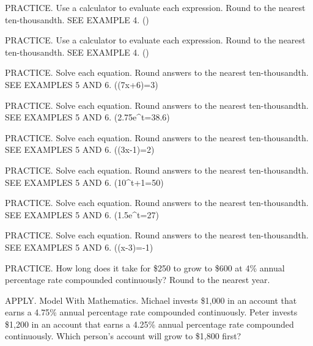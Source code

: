 \documentclass{article}
\newenvironment{practice}[2]{}{}        %
\newcommand{\answer}[1]{}               %
\begin{document}
\begin{practice}{44}{1}
PRACTICE. Use a calculator to evaluate each expression. Round to the nearest ten-thousandth. SEE EXAMPLE 4.
()
\answer{1.0792}
\end{practice}
\begin{practice}{45}{2}
PRACTICE. Use a calculator to evaluate each expression. Round to the nearest ten-thousandth. SEE EXAMPLE 4.
()
\answer{1.0986}
\end{practice}
\begin{practice}{46}{2}
PRACTICE. Solve each equation. Round answers to the nearest ten-thousandth. SEE EXAMPLES 5 AND 6.
(\log(7x+6)=3)
\answer{142}
\end{practice}
\begin{practice}{47}{2}
PRACTICE. Solve each equation. Round answers to the nearest ten-thousandth. SEE EXAMPLES 5 AND 6.
(2.75e^t=38.6)
\answer{2.6417}
\end{practice}
\begin{practice}{48}{2}
PRACTICE. Solve each equation. Round answers to the nearest ten-thousandth. SEE EXAMPLES 5 AND 6.
(\ln(3x-1)=2)
\answer{2.7964}
\end{practice}
\begin{practice}{49}{2}
PRACTICE. Solve each equation. Round answers to the nearest ten-thousandth. SEE EXAMPLES 5 AND 6.
(10^{t+1}=50)
\answer{0.6990}
\end{practice}
\begin{practice}{50}{2}
PRACTICE. Solve each equation. Round answers to the nearest ten-thousandth. SEE EXAMPLES 5 AND 6.
(1.5e^t=27)
\answer{2.8904}
\end{practice}
\begin{practice}{51}{2}
PRACTICE. Solve each equation. Round answers to the nearest ten-thousandth. SEE EXAMPLES 5 AND 6.
(\log(x-3)=-1)
\answer{3.1}
\end{practice}
\begin{practice}{52}{2}
PRACTICE. How long does it take for \$250 to grow to \$600 at 4\% annual percentage rate compounded continuously? Round to the nearest year.
\answer{22 years}
\end{practice}
\begin{practice}{53}{2}
APPLY. Model With Mathematics. Michael invests \$1,000 in an account that earns a 4.75\% annual percentage rate compounded continuously. Peter invests \$1,200 in an account that earns a 4.25\% annual percentage rate compounded continuously. Which person's account will grow to \$1,800 first?
\answer{Peter's account}
\end{practice}
\end{document}
